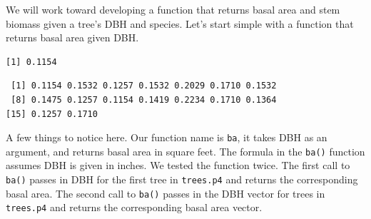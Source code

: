 \documentclass[]{krantz}
\makeatletter
\newenvironment{Shaded}{\begin{snugshade}}{\end{snugshade}}
\newcommand{\ControlFlowTok}[1]{\textcolor[rgb]{0.27,0.27,0.27}{\textbf{#1}}}
\newcommand{\DecValTok}[1]{\textcolor[rgb]{0.06,0.06,0.06}{#1}}
\newcommand{\ErrorTok}[1]{\textcolor[rgb]{0.14,0.14,0.14}{\textbf{#1}}}
\newcommand{\FloatTok}[1]{\textcolor[rgb]{0.06,0.06,0.06}{#1}}
\newcommand{\KeywordTok}[1]{\textcolor[rgb]{0.27,0.27,0.27}{\textbf{#1}}}
\newcommand{\NormalTok}[1]{#1}
\newcommand{\OperatorTok}[1]{\textcolor[rgb]{0.43,0.43,0.43}{\textbf{#1}}}
\newcommand{\StringTok}[1]{\textcolor[rgb]{0.5,0.5,0.5}{#1}}
\newenvironment{kframe}{%
\medskip{}
\setlength{\fboxsep}{.8em}
 \def\at@end@of@kframe{}%
 \ifinner\ifhmode%
  \def\at@end@of@kframe{\end{minipage}}%
  \begin{minipage}{\columnwidth}%
 \fi\fi%
 \def\FrameCommand##1{\hskip\@totalleftmargin \hskip-\fboxsep
 \colorbox{shadecolor}{##1}\hskip-\fboxsep
     \hskip-\linewidth \hskip-\@totalleftmargin \hskip\columnwidth}%
 \MakeFramed {\advance\hsize-\width
   \@totalleftmargin\z@ \linewidth\hsize
   \@setminipage}}%
 {\par\unskip\endMakeFramed%
 \at@end@of@kframe}
\renewenvironment{Shaded}{\begin{kframe}}{\end{kframe}}
\makeatother
\begin{document}
We will work toward developing a function that returns basal area and stem biomass given a tree's DBH and species. Let's start simple with a function that returns basal area given DBH.

\begin{Shaded}
\end{Shaded}

\begin{verbatim}
[1] 0.1154
\end{verbatim}

\begin{Shaded}
\end{Shaded}

\begin{verbatim}
 [1] 0.1154 0.1532 0.1257 0.1532 0.2029 0.1710 0.1532
 [8] 0.1475 0.1257 0.1154 0.1419 0.2234 0.1710 0.1364
[15] 0.1257 0.1710
\end{verbatim}

A few things to notice here. Our function name is \texttt{ba}, it takes DBH as an argument, and returns basal area in square feet. The formula in the \texttt{ba()} function assumes DBH is given in inches. We tested the function twice. The first call to \texttt{ba()} passes in DBH for the first tree in \texttt{trees.p4} and returns the corresponding basal area. The second call to \texttt{ba()} passes in the DBH vector for trees in \texttt{trees.p4} and returns the corresponding basal area vector.
\end{document}
